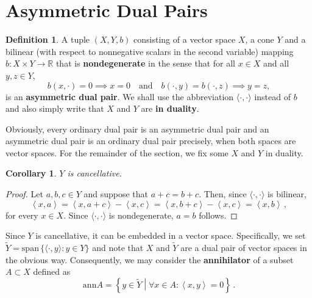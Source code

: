 \documentclass[
	paper=A4,
	pagesize=auto,
	fontsize=12pt
]{scrartcl}
\theoremstyle{plain}
\newtheorem{corollary}[theorem]{Corollary}
\theoremstyle{remark}
\theoremstyle{definition}
\newtheorem{definition}[theorem]{Definition}
\begin{document}
\section{Asymmetric Dual Pairs}
\label{sec:AsymmetricDualPairs}
%
\begin{definition}
A tuple $(X, Y, b)$ consisting of a vector space $X$, a cone $Y$ and a bilinear (with respect to nonnegative scalars in the second variable) mapping $b : X \times Y \to \mathbb{R}$ that is \textbf{nondegenerate} in the sense that for all $x \in X$ and all $y, z \in Y$,
%
\begin{equation}
b(x, \cdot) = 0 \implies x = 0
\quad\text{and}\quad
b( \cdot , y) = b( \cdot , z)  \implies y = z,
\end{equation}
%
is an \textbf{asymmetric dual pair}.
We shall use the abbreviation $\langle \cdot, \cdot \rangle$ instead of $b$ and also simply write that $X$ and $Y$ are \textbf{in duality}.
\end{definition}
%
Obviously, every ordinary dual pair is an asymmetric dual pair and an asymmetric dual pair is an ordinary dual pair precisely, when both spaces are vector spaces.
For the remainder of the section, we fix some $X$ and $Y$ in duality.
%
\begin{corollary}
$Y$ is cancellative.
\end{corollary}
\begin{proof}
Let $a, b, c \in Y$ and suppose that $a + c = b + c$.
Then, since $\langle \cdot, \cdot \rangle$ is bilinear,
%
\begin{equation}
\left< x, a \right> 
=
\left< x, a + c \right> - \left< x, c \right>
=
\left< x, b + c \right> - \left< x, c \right>
=
\left< x, b \right> \, ,
\end{equation}
%
for every $x \in X$.
Since $\langle \cdot, \cdot \rangle$ is nondegenerate, $a = b$ follows.
\end{proof}
%
Since $Y$ is cancellative, it can be embedded in a vector space.
Specifically, we set $\widetilde{Y} = \mathrm{span}\, \{ \langle \cdot, y \rangle : y \in Y \}$ and note that $X$ and $\widetilde{Y}$ are a dual pair of vector spaces in the obvious way.
Consequently, we may consider the \textbf{annihilator} of a subset $A \subset X$ defined as
%
\begin{equation}
\mathrm{ann} A
=
\left\{ y \in \widetilde{Y} \middle| \forall x \in A : \left< x, y \right> = 0 \right\} \, .
\end{equation}
%
\end{document}
